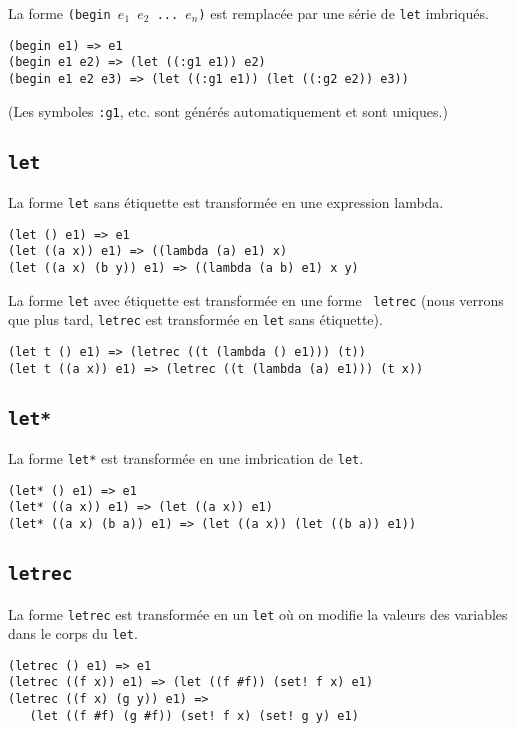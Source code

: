 \documentclass[11pt]{report}
\begin{document}
La forme {\tt (begin $e_1$ $e_2$ ... $e_n$)} est remplacée par une
série de {\tt let} imbriqués.


\begin{verbatim}
(begin e1) => e1
(begin e1 e2) => (let ((:g1 e1)) e2)
(begin e1 e2 e3) => (let ((:g1 e1)) (let ((:g2 e2)) e3))
\end{verbatim}

(Les symboles {\tt :g1}, etc. sont générés automatiquement et sont
uniques.)

\subsection{\tt let}

La forme {\tt let} sans étiquette est transformée en une expression
lambda.

\begin{verbatim}
(let () e1) => e1
(let ((a x)) e1) => ((lambda (a) e1) x)
(let ((a x) (b y)) e1) => ((lambda (a b) e1) x y)
\end{verbatim}

La forme {\tt let} avec étiquette est transformée en une forme {\tt
  letrec} (nous verrons que plus tard, {\tt letrec} est transformée
en {\tt let} sans étiquette).

\begin{verbatim}
(let t () e1) => (letrec ((t (lambda () e1))) (t))
(let t ((a x)) e1) => (letrec ((t (lambda (a) e1))) (t x))
\end{verbatim}


\subsection{\tt let*}

La forme {\tt let*} est transformée en une imbrication de {\tt let}.

\begin{verbatim}
(let* () e1) => e1
(let* ((a x)) e1) => (let ((a x)) e1)
(let* ((a x) (b a)) e1) => (let ((a x)) (let ((b a)) e1))
\end{verbatim}


\subsection{\tt letrec}

La forme {\tt letrec} est transformée en un {\tt let} où on modifie la
valeurs des variables dans le corps du {\tt let}.

\begin{verbatim}
(letrec () e1) => e1
(letrec ((f x)) e1) => (let ((f #f)) (set! f x) e1)
(letrec ((f x) (g y)) e1) =>
   (let ((f #f) (g #f)) (set! f x) (set! g y) e1)
\end{verbatim}
\end{document}
